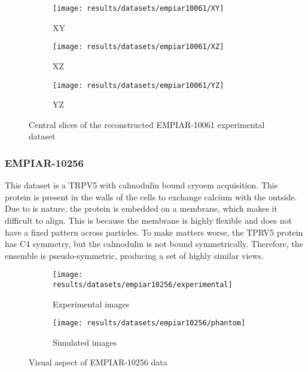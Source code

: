\documentclass[../main.tex]{subfiles}
\begin{document}
\begin{figure}[htbp]
    \centering
    \begin{subfigure}[b]{0.3\textwidth}
         \centering
         \texttt{[image: results/datasets/empiar10061/XY]}
         \caption{XY}
    \end{subfigure}
    \hfill
    \begin{subfigure}[b]{0.3\textwidth}
         \centering
         \texttt{[image: results/datasets/empiar10061/XZ]}
         \caption{XZ}
    \end{subfigure}
    \hfill
    \begin{subfigure}[b]{0.3\textwidth}
         \centering
         \texttt{[image: results/datasets/empiar10061/YZ]}
         \caption{YZ}
    \end{subfigure}

    \caption{Central slices of the reconstructed EMPIAR-10061 experimental dataset}
    \label{fig:5:empiar10061_rec}
\end{figure}

\subsubsection{EMPIAR-10256}
This dataset is  a TRPV5 with calmodulin bound \gls{cryoem} acquisition\cite{dang2019}\cite{empiar10256}. This protein is present in the walls of the cells to exchange calcium with the outside. Due to is nature, the protein is embedded on a membrane, which makes it difficult to align. This is because the membrane is highly flexible and does not have a fixed pattern across particles. To make matters worse, the TPRV5 protein has C4 symmetry, but the calmodulin is not bound symmetrically. Therefore, the ensemble is pseudo-symmetric, producing a set of highly similar views.

\begin{figure}[htbp]
    \centering
    \begin{subfigure}[b]{0.45\textwidth}
         \centering
         \texttt{[image: results/datasets/empiar10256/experimental]}
         \caption{Experimental images}
    \end{subfigure}
    \hfill
    \begin{subfigure}[b]{0.45\textwidth}
         \centering
         \texttt{[image: results/datasets/empiar10256/phantom]}
         \caption{Simulated images}
    \end{subfigure}
    \caption{Visual aspect of EMPIAR-10256 data}
    \label{fig:5:empiar10256}
\end{figure}
\end{document}
